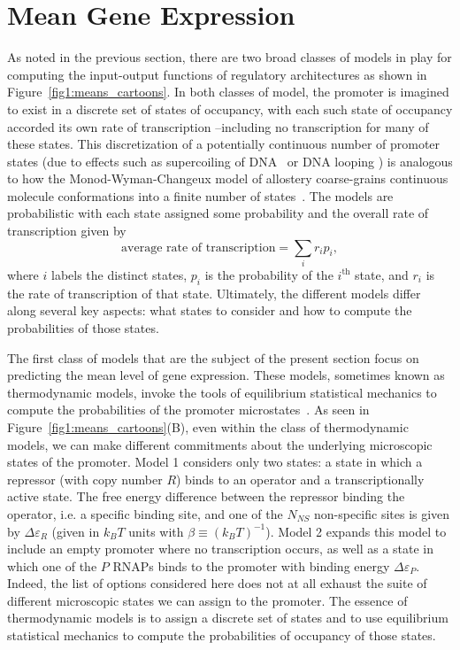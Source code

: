 \section{Mean Gene Expression}\label{section_02_means}

As noted in the previous section, there are two broad classes of models in play
for computing the input-output functions of regulatory architectures as shown in
Figure~\ref{fig1:means_cartoons}. In both classes of model, the promoter is
imagined to exist in a discrete set of states of occupancy, with each such state
of occupancy accorded its own rate of transcription --including no
transcription for many of these states. This discretization of a potentially
continuous number of promoter states (due to effects such as supercoiling of
DNA~\cite{Chong2014, Sevier2016} or DNA looping \cite{Boedicker2013a}) is
analogous to how the Monod-Wyman-Changeux model of allostery coarse-grains
continuous molecule conformations into a finite number of
states~\cite{Martins2011}. The models are probabilistic with each state assigned
some probability and the overall rate of transcription given by 
\begin{equation}
\mbox{average rate of transcription} = \sum_i r_i p_i,
\label{eq:transcrip_prop_pbound}
\end{equation}
where $i$ labels the distinct states, $p_i$ is the probability of the
$i^{\text{th}}$ state, and $r_i$ is the rate of transcription of that state.
Ultimately, the different models differ along several key aspects: what states
to consider and how to compute the probabilities of those states.

The first class of models that are the subject of the present section focus on
predicting the mean level of gene expression. These models, sometimes known as
thermodynamic models, invoke the tools of equilibrium statistical mechanics to
compute the probabilities of the promoter microstates~\cite{Ackers1982,
Shea1985, Buchler2003, Vilar2003a, Vilar2003b, Bintu2005a, Bintu2005c,
Gertz2009, Sherman2012, Saiz2013}. As seen in
Figure~\ref{fig1:means_cartoons}(B), even within the class of thermodynamic
models, we can make different commitments about the underlying microscopic
states of the promoter. Model 1 considers only two states: a state in which a
repressor (with copy number $R$) binds to an operator and a transcriptionally
active state. The free energy difference between the repressor binding the
operator, i.e. a specific binding site, and one of the $N_{NS}$ non-specific
sites is given by $\Delta\varepsilon_R$ (given in $k_BT$ units with $\beta\equiv
(k_BT)^{-1}$). Model 2 expands this model to include an empty promoter where no
transcription occurs, as well as a state in which one of the $P$ RNAPs binds to
the promoter with binding energy $\Delta\varepsilon_P$. Indeed, the list of
options considered here does not at all exhaust the suite of different
microscopic states we can assign to the promoter. The essence of thermodynamic 
models is to assign a discrete set of states and to use equilibrium statistical 
mechanics to compute the probabilities of occupancy of those states.

